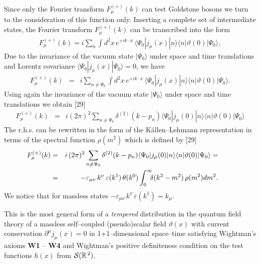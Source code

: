 \documentclass[a4paper,12pt] {article}
\begin{document}
Since only the Fourier transform $F^{(+)}_{\mu}(k)$ can test Goldstone
bosons we turn to the consideration of this function only. Inserting a
complete set of intermediate states, the Fourier transform
$F^{(+)}_{\mu}(k)$ can be transcribed into the form
%
\begin{eqnarray}\label{label4.2}
F^{(+)}_{\mu}(k) = i\sum_{n}\int d^2x\,e^{\textstyle +
ik\cdot x}\, \langle \Psi_0|j_{\mu}(x)|n\rangle\langle
n|\vartheta(0)|\Psi_0\rangle,
\end{eqnarray}
%
Due to the invariance of the vacuum state $|\Psi_0\rangle$ under space
and time translations and Lorentz covariance
$\langle\Psi_0|j_{\mu}(x)|\Psi_0\rangle = 0$, we have
%
\begin{eqnarray}\label{label4.3}
F^{(+)}_{\mu}(k) &=& i\sum_{n\neq \Psi_0} \int
d^2x\,e^{\textstyle + ik\cdot x}\, \langle
\Psi_0|j_{\mu}(x)|n\rangle\langle
n|\vartheta(0)|\Psi_0\rangle.
\end{eqnarray}
%
Using again the invariance of the vacuum state $|\Psi_0\rangle$ under
space and time translations we obtain [29]
%
\begin{eqnarray}\label{label4.4}
F^{(+)}_{\mu}(k)
&=&i(2\pi)^2 \sum_{n\neq \Psi_0 }\delta^{(2)}(k -
p_n)\langle\Psi_0|j_{\mu}(0)|n\rangle\langle n|\vartheta(0)|
\Psi_0\rangle
\end{eqnarray}
%
The r.h.s. can be rewritten in the form of the K\"allen--Lehmann
representation in terms of the spectral function $\rho(m^2)$ which is
defined by [29]
%
\begin{eqnarray}\label{label4.5}
\hspace{-0.3in}F^{(+)}_{\mu}(k)&=&i\,(2\pi)^2\sum_{n\neq
\Psi_0}\delta^{(2)}(k - p_n)\langle\Psi_0|j_{\mu}(0)|n\rangle\langle
n|\vartheta(0)|\Psi_0\rangle = \nonumber\\
\hspace{-0.3in}&=& - \varepsilon_{\mu\nu}\,k^{\nu}\,
\varepsilon(k^1)\,\theta(k^0) \int^{\infty}_0\!\!\!\delta(k^2 -
m^2)\,\rho(m^2)dm^2.
\end{eqnarray}
%
We notice that for massless states $-
\varepsilon_{\mu\nu} \,k^{\nu}\, \varepsilon(k^1) = k_{\mu}$.

This is the most general form of a {\it tempered} distribution in the
quantum field theory of a massless self--coupled (pseudo)scalar field
$\vartheta(x)$ with current conservation $\partial^{\mu}j_{\mu}(x) =
0$ in 1+1--dimensional space--time satisfying Wightman's axioms {\bf
W1} -- {\bf W4} and Wightman's positive definiteness condition on the
test functions $h(x)$ from ${\cal S}(\mathbb{R}^{\,2})$.
\end{document}
